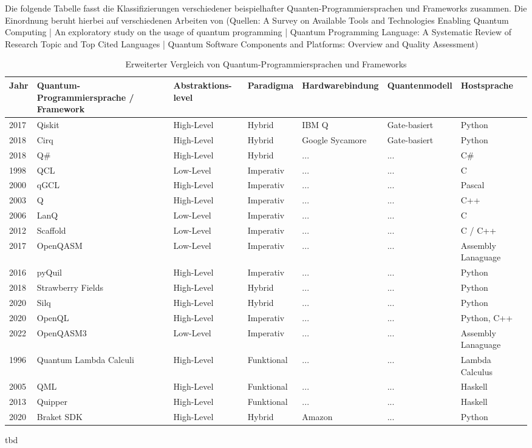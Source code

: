 Die folgende Tabelle fasst die Klassifizierungen verschiedener beispielhafter Quanten-Programmiersprachen und Frameworks zusammen. Die Einordnung beruht hierbei auf verschiedenen Arbeiten von (Quellen: A Survey on Available Tools and Technologies Enabling Quantum Computing | An exploratory study on the usage of quantum programming | Quantum Programming Language: A Systematic Review of Research Topic and Top Cited Languages | Quantum Software Components and Platforms: Overview and Quality Assessment)

\begin{table}[H]
\centering
\footnotesize
\begin{tabular}{|p{1cm}|p{3cm}|p{2cm}|l|l|p{2cm}|p{2cm}|}
\hline
\textbf{Jahr} & 
\textbf{Quantum-Programmiersprache / Framework} & 
\textbf{Abstraktions-level} & 
\textbf{Paradigma} & 
\textbf{Hardwarebindung} & 
\textbf{Quantenmodell} & 
\textbf{Hostsprache} \\
\hline
2017 & Qiskit & High-Level & Hybrid & IBM Q & Gate-basiert & Python \\
\hline
2018 & Cirq & High-Level & Hybrid & Google Sycamore & Gate-basiert & Python \\
\hline
2018 & Q\# & High-Level & Hybrid & ... & ...& C\# \\
\hline
1998 & QCL & Low-Level & Imperativ & ... & ... & C \\
\hline
2000 & qGCL & High-Level & Imperativ & ... & ... & Pascal \\
\hline
2003 & Q & High-Level & Imperativ & ... & ... & C++ \\
\hline
2006 & LanQ & Low-Level & Imperativ & ... & ... & C \\
\hline
2012 & Scaffold & Low-Level & Imperativ & ... & ... & C / C++ \\
\hline
2017 & OpenQASM & Low-Level & Imperativ & ... & ... & Assembly Lanaguage \\
\hline
2016 & pyQuil & High-Level & Imperativ & ... & ... & Python \\
\hline
2018 & Strawberry Fields & High-Level & Hybrid & ... & ... & Python \\
\hline
2020 & Silq & High-Level & Hybrid & ... & ... & Python \\
\hline
2020 & OpenQL & High-Level & Imperativ & ... & ... & Python, C++ \\
\hline
2022 & OpenQASM3 & Low-Level & Imperativ & ... & ... & Assembly Lanaguage \\
\hline
1996 & Quantum Lambda Calculi & High-Level & Funktional & ... & ... & Lambda Calculus \\
\hline
2005 & QML & High-Level & Funktional & ... & ... & Haskell \\
\hline
2013 & Quipper & High-Level & Funktional & ... & ... & Haskell \\
\hline
2020 & Braket SDK & High-Level & Hybrid & Amazon & ... & Python \\




\hline
\end{tabular}
\caption{Erweiterter Vergleich von Quantum-Programmiersprachen und Frameworks}
\label{tab:quantum_languages_full}
\end{table}
tbd

